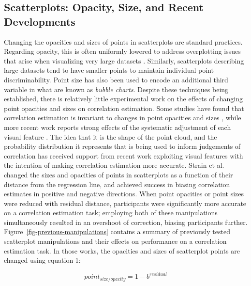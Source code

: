 \documentclass[manuscript,screen,review,anonymous]{acmart}
\begin{document}
\subsection{Scatterplots: Opacity, Size, and Recent
Developments}\label{sec-scatterplots}

Changing the opacities and sizes of points in scatterplots are standard
practices. Regarding opacity, this is often uniformly lowered to address
overplotting issues that arise when visualizing very large datasets
\citep{matejka_2015}. Similarly, scatterplots describing large datasets
tend to have smaller points to maintain individual point
discriminability. Point size has also been used to encode an additional
third variable in what are known as \emph{bubble charts}. Despite these
techniques being established, there is relatively little experimental
work on the effects of changing point opacities and sizes on correlation
estimation. Some studies have found that correlation estimation is
invariant to changes in point opacities and sizes
\citep{rensink_2014, rensink_2017}, while more recent work reports
strong effects of the systematic adjustment of each visual feature
\citep{strain_2023, strain_2023b, strain_2024}. The idea that it is the
shape of the point cloud, and the probability distribution it represents
that is being used to inform judgements of correlation has received
support from recent work exploiting visual features with the intention
of making correlation estimation more accurate. Strain et al.
\citep{strain_2023, strain_2023b, strain_2024} changed the sizes and
opacities of points in scatterplots as a function of their distance from
the regression line, and achieved success in biasing correlation
estimates in positive and negative directions. When point opacities
\citep{strain_2023} or point sizes \citep{strain_2023b} were reduced
with residual distance, participants were significantly more accurate on
a correlation estimation task; employing both of these manipulations
simultaneously \citep{strain_2024} resulted in an overshoot of
correction, biasing participants further.
Figure~\ref{fig-previous-manipulations} contains a summary of previously
tested scatterplot manipulations and their effects on performance on a
correlation estimation task. In those works, the opacities and sizes of
scatterplot points are changed using equation 1:

\begin{equation}
  point_{size/opacity} = 1 - b^{residual}
\end{equation}
\end{document}
